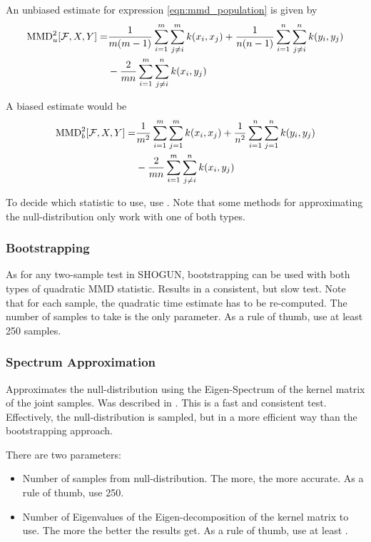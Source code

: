 An unbiased estimate for expression \ref{eqn:mmd_population} is given by
\begin{align*}
\operatorname{MMD}_u^2[\mathcal{F},X,Y]=&\frac{1}{m(m-1)}\sum_{i=1}^m\sum_{j\neq i}^mk(x_i,x_j) + \frac{1}{n(n-1)}\sum_{i=1}^n\sum_{j\neq i}^nk(y_i,y_j)\\
&-\frac{2}{mn}\sum_{i=1}^m\sum_{j\neq i}^nk(x_i,y_j)
\end{align*}

A biased estimate would be
\begin{align*}
\operatorname{MMD}_b^2[\mathcal{F},X,Y]=&\frac{1}{m^2}\sum_{i=1}^m\sum_{j=1}^mk(x_i,x_j) + \frac{1}{n^ 2}\sum_{i=1}^n\sum_{j=1}^nk(y_i,y_j)\\
&-\frac{2}{mn}\sum_{i=1}^m\sum_{j\neq i}^nk(x_i,y_j)
\end{align*}

To decide which statistic to use, use . Note that some methods for approximating the null-distribution only work with one of both types.

\subsubsection{Bootstrapping}
As for any two-sample test in SHOGUN, bootstrapping can be used with both types of quadratic MMD statistic. Results in a consistent, but slow test. Note that for each sample, the quadratic time estimate has to be re-computed. The number of samples to take is the only parameter. As a rule of thumb, use at least 250 samples.

\subsubsection{Spectrum Approximation}
Approximates the null-distribution using the Eigen-Spectrum of the kernel matrix of the joint samples. Was described in \citep{Gretton2012b}. This is a fast and consistent test. Effectively, the null-distribution is sampled, but in a more efficient way than the bootstrapping approach.

There are two parameters:
\begin{itemize}
\item Number of samples from null-distribution. The more, the more accurate. As a rule of thumb, use 250.
\item Number of Eigenvalues of the Eigen-decomposition of the kernel matrix to use. The more the better the results get. As a rule of thumb, use at least .
\end{itemize}

